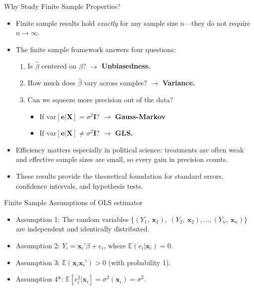 \documentclass[aspectratio=169, handout]{beamer}
\numberwithin{equation}{section}
\begin{document}
\begin{frame}{Why Study Finite Sample Properties?}
\begin{itemize}
\item Finite sample results hold \emph{exactly} for any sample size $n$---they do not require $n\to\infty$.
\item The finite sample framework answers four questions:
\begin{enumerate}
\item Is $\hat{\beta}$ centered on $\beta$? $\to$ \textbf{Unbiasedness.}
\item How much does $\hat{\beta}$ vary across samples? $\to$ \textbf{Variance.}
\item Can we squeeze more precision out of the data?
\begin{itemize}
\item If $\text{var}[\bm{e}|\bm{X}]=\sigma^2\bm{I}$? $\to$ \textbf{Gauss-Markov}
\item If $\text{var}[\bm{e}|\bm{X}]\neq\sigma^2\bm{I}$? $\to$ \textbf{GLS.}
\end{itemize}
\end{enumerate}\pause
\item Efficiency matters especially in political science: treatments are often weak and effective sample sizes are small, so every gain in precision counts.
\item These results provide the theoretical foundation for standard errors, confidence intervals, and hypothesis tests.
\end{itemize}
\end{frame}

\begin{frame}{Finite Sample Assumptions of OLS estimator}
\begin{itemize}
\item Assumption 1: The random variables $\{(Y_1,\ \bm{x}_1),\ (Y_2,\ \bm{x}_2), \ldots, (Y_n,\ \bm{x}_n)\}$ are independent and identically distributed.
\item Assumption 2: $Y_i=\bm{x}_i'\beta+e_i$, where $\mathbb{E}(e_i|\bm{x}_i)=0$.
\item Assumption 3: $\mathbb{E}(\bm{x}_i\bm{x}_i')>0$ (with probability 1).
\item Assumption 4*: $\mathbb{E}[e_i^2|\bm{x}_i]=\sigma^2(\bm{x}_i)=\sigma^2$.
\end{itemize}
\end{frame}
\end{document}
